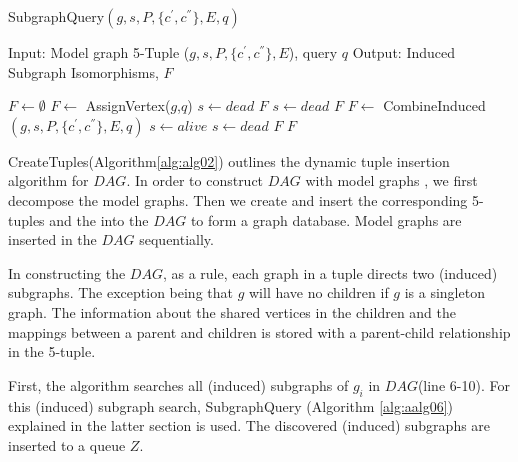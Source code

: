 \begin{algorithm}
\caption{SubgraphQuery$(g,s,P,\{c^{'},c^{''}\},E, q)$}
\label{alg:aalg06}
\begin{algorithmic}
\STATE Input: Model graph 5-Tuple ($g,s,P,\{c^{'},c^{''}\},E$), query $q$
\STATE Output: Induced Subgraph Isomorphisms, $F$
\end{algorithmic}
\begin{algorithmic}[1]
\STATE $F \leftarrow \emptyset $
        \STATE $F \leftarrow$ AssignVertex($g$,$q$)
      \ELSE 
          \STATE  $s \leftarrow dead$
          \RETURN $F$
			\STATE $s \leftarrow dead$
                         \RETURN $F$
		\ELSE
			\STATE $F \leftarrow$ CombineInduced$(g,s,P,\{c^{'},c^{''}\},E ,q)$
		\ENDIF
	\ENDIF
		\STATE $s \leftarrow alive$
	\ELSE
		\STATE $s \leftarrow dead$
                 \RETURN $F$
	\ENDIF
\ELSE
        \RETURN $F$
\ENDIF
          
\end{algorithmic}
\end{algorithm}


CreateTuples(Algorithm\ref{alg:alg02}) outlines the dynamic tuple insertion algorithm for $DAG$. 
In order to construct $DAG$ with model graphs , we first decompose the model graphs. 
Then we create and insert the corresponding 5-tuples and the into the $DAG$ to form a graph database. 
Model graphs are inserted in the $DAG$ sequentially.

In constructing the $DAG$, as a rule, each graph in a tuple directs two (induced) subgraphs. 
The exception being that $g$ will have no children if $g$ is a singleton graph. 
The information about the shared vertices in the children and the mappings between a parent and children is  stored with a parent-child relationship in the 5-tuple.

First, the algorithm searches all (induced) subgraphs of $g_i$ in $DAG$(line 6-10). 
For this (induced) subgraph search, SubgraphQuery (Algorithm \ref{alg:aalg06}) explained in the latter section is used. 
The discovered (induced) subgraphs are inserted to a queue $Z$.

